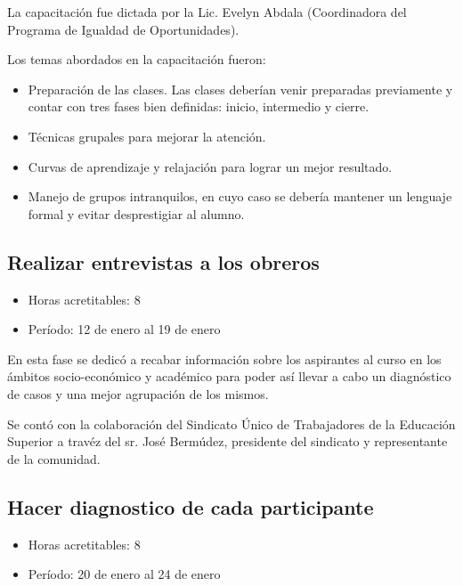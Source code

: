              La capacitación fue dictada por la Lic. Evelyn Abdala (Coordinadora del Programa de Igualdad de
             Oportunidades).
             
             Los temas abordados en la capacitación fueron:
             
             \begin{itemize}
                 \item Preparación de las clases. Las clases deberían venir preparadas previamente y contar con tres fases bien definidas: inicio, intermedio y cierre.
                 
                 \item Técnicas grupales para mejorar la atención.
                 
                 \item Curvas de aprendizaje y relajación para lograr un mejor resultado.
                 
                 \item Manejo de grupos intranquilos, en cuyo caso se debería mantener un lenguaje formal y evitar desprestigiar al alumno.
                 
                \end{itemize}
             
             \subsection {Realizar entrevistas a los obreros}
             \begin{itemize}
                 \item Horas acretitables: 8
                 \item Período: 12 de enero al 19 de enero
                \end{itemize}
             
             En esta fase se dedicó a recabar información sobre los aspirantes al curso en los ámbitos socio-económico y académico para poder así llevar a cabo un diagnóstico de casos y una mejor agrupación de los mismos.
             
             Se contó con la colaboración del Sindicato Único de Trabajadores de la Educación Superior a travéz del sr. José Bermúdez, presidente del sindicato y representante de la comunidad.
             
             \subsection {Hacer diagnostico de cada participante}
             \begin{itemize}
                 \item Horas acretitables: 8
                 \item Período: 20 de enero al 24 de enero
                \end{itemize}
                
